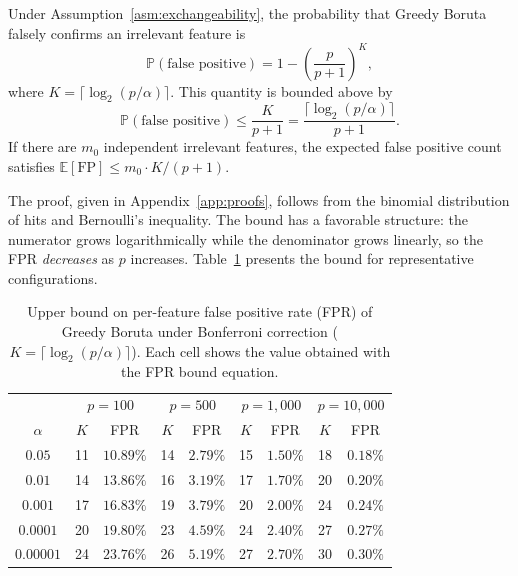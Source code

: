 \documentclass[runningheads]{llncs}
\begin{document}
\begin{theorem}
\label{thm:fpr}
Under Assumption~\ref{asm:exchangeability}, the probability that Greedy Boruta falsely confirms an irrelevant feature is
\begin{equation}
\label{eq:fpr_exact}
    \mathbb{P}(\text{false positive}) = 1 - \left(\frac{p}{p+1}\right)^{K},
\end{equation}
where $K = \lceil \log_2(p/\alpha) \rceil$. This quantity is bounded above by
\begin{equation}
\label{eq:fpr_bound}
    \mathbb{P}(\text{false positive}) \leq \frac{K}{p + 1} = \frac{\lceil \log_2(p/\alpha) \rceil}{p + 1}.
\end{equation}
If there are $m_0$ independent irrelevant features, the expected false positive count satisfies $\mathbb{E}[\text{FP}] \leq m_0 \cdot K / (p+1)$.
\end{theorem}

The proof, given in Appendix~\ref{app:proofs}, follows from the binomial distribution of hits and Bernoulli's inequality. The bound has a favorable structure: the numerator grows logarithmically while the denominator grows linearly, so the FPR \emph{decreases} as $p$ increases. Table~\ref{tab:fpr} presents the bound for representative configurations.

\begin{table}[t]
\caption{Upper bound on per-feature false positive rate (FPR) of Greedy Boruta under Bonferroni correction ($K = \lceil \log_2(p/\alpha) \rceil$). Each cell shows the value obtained with the FPR bound equation.}
\label{tab:fpr}
\centering
\begin{tabular}{c|cc|cc|cc|cc}
\toprule
& \multicolumn{2}{c|}{$p = 100$}
& \multicolumn{2}{c|}{$p = 500$}
& \multicolumn{2}{c|}{$p = 1{,}000$}
& \multicolumn{2}{c}{$p = 10{,}000$} \\
$\alpha$
& $K$ & FPR
& $K$ & FPR
& $K$ & FPR
& $K$ & FPR \\
\midrule
$0.05$    
& 11 & $10.89\%$
& 14 & $2.79\%$
& 15 & $1.50\%$
& 18 & $0.18\%$ \\

$0.01$    
& 14 & $13.86\%$
& 16 & $3.19\%$
& 17 & $1.70\%$
& 20 & $0.20\%$ \\

$0.001$   
& 17 & $16.83\%$
& 19 & $3.79\%$
& 20 & $2.00\%$
& 24 & $0.24\%$ \\

$0.0001$  
& 20 & $19.80\%$
& 23 & $4.59\%$
& 24 & $2.40\%$
& 27 & $0.27\%$ \\

$0.00001$ 
& 24 & $23.76\%$
& 26 & $5.19\%$
& 27 & $2.70\%$
& 30 & $0.30\%$ \\
\bottomrule
\end{tabular}
\end{table}
\end{document}
